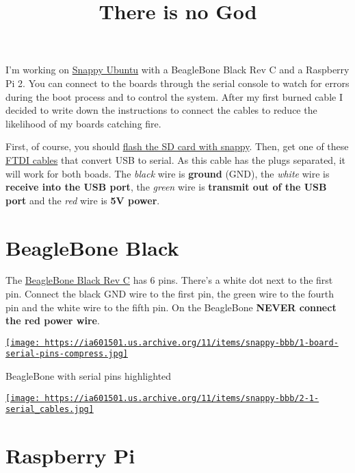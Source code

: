 \documentclass[12pt]{article}
\title{There is no God}
\begin{document}
I'm working on \href{https://developer.ubuntu.com/en/snappy/}{Snappy Ubuntu}
with a BeagleBone Black Rev C and a Raspberry Pi 2. You can connect to the
boards through the serial console to watch for errors during the boot process
and to control the system. After my first burned cable I decided to write down
the instructions to connect the cables to reduce the likelihood of my boards
catching fire.

First, of course, you should
\href{https://developer.ubuntu.com/en/snappy/start/}{flash the SD card with
snappy}. Then, get one of these \href{http://www.adafruit.com/products/954}
{FTDI cables} that convert USB to serial. As this cable has the plugs
separated, it will work for both boads. The \emph{black} wire is
\textbf{ground} (GND), the \emph{white} wire is \textbf{receive into the USB port}, the \emph{green} wire is \textbf{transmit out of the USB port} and the
\emph{red} wire is \textbf{5V power}.

\section{BeagleBone Black}

The \href{https://www.adafruit.com/product/1876}{BeagleBone Black Rev C} has 6
pins. There's a white dot next to the first pin. Connect the black GND wire to
the first pin, the green wire to the fourth pin and the white wire to the fifth
pin. On the BeagleBone \textbf{NEVER connect the red power wire}.

\begin{center}
  \href{
    https://ia601501.us.archive.org/11/items/snappy-bbb/1-board-serial-pins-compress.jpg}{
    \texttt{[image: 
      https://ia601501.us.archive.org/11/items/snappy-bbb/1-board-serial-pins-compress.jpg]}
  }
  \caption{BeagleBone with serial pins highlighted}
\end{center}

\begin{center}
  \href{
    https://ia601501.us.archive.org/11/items/snappy-bbb/2-1-serial_cables.jpg}{
    \texttt{[image: 
      https://ia601501.us.archive.org/11/items/snappy-bbb/2-1-serial\_cables.jpg]}
  }
\end{center}

\section{Raspberry Pi}
\end{document}
